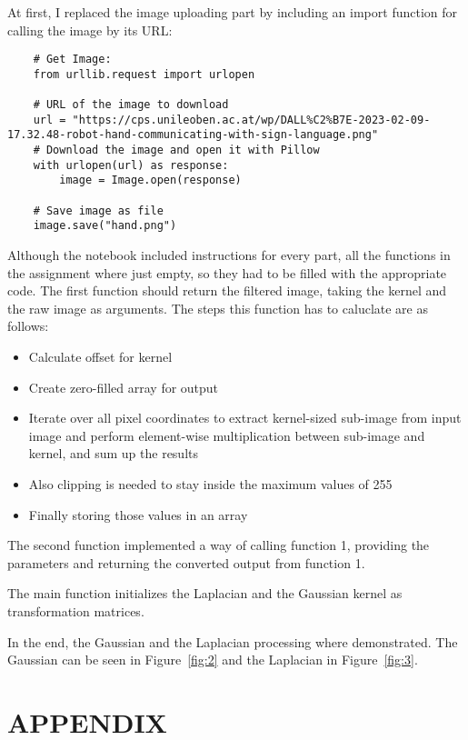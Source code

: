 \documentclass{CPSReport}
\begin{document}
At first, I replaced the image uploading part by including an import function for calling the image by its URL:

\begin{verbatim}
    # Get Image:
    from urllib.request import urlopen

    # URL of the image to download
    url = "https://cps.unileoben.ac.at/wp/DALL%C2%B7E-2023-02-09-17.32.48-robot-hand-communicating-with-sign-language.png"
    # Download the image and open it with Pillow
    with urlopen(url) as response:
        image = Image.open(response)

    # Save image as file
    image.save("hand.png")
\end{verbatim}

Although the notebook included instructions for every part, all the functions in the assignment where just empty, so they had to be filled with the appropriate code.
The first function should return the filtered image, taking the kernel and the raw image as arguments. The steps this function has to caluclate are as follows:
\begin{itemize}
    \item Calculate offset for kernel
    \item Create zero-filled array for output
    \item Iterate over all pixel coordinates to extract kernel-sized sub-image from input image and perform element-wise multiplication between sub-image and kernel, and sum up the results
    \item Also clipping is needed to stay inside the maximum values of 255
    \item Finally storing those values in an array
\end{itemize}

The second function implemented a way of calling function 1, providing the parameters and returning the converted output from function 1.

The main function initializes the Laplacian and the Gaussian kernel as transformation matrices.

In the end, the Gaussian and the Laplacian processing where demonstrated. The Gaussian can be seen in Figure~\ref{fig:2} and the Laplacian in Figure~\ref{fig:3}.
\clearpage

\onecolumn
\section*{APPENDIX}\label{sec:appendix}
\end{document}
